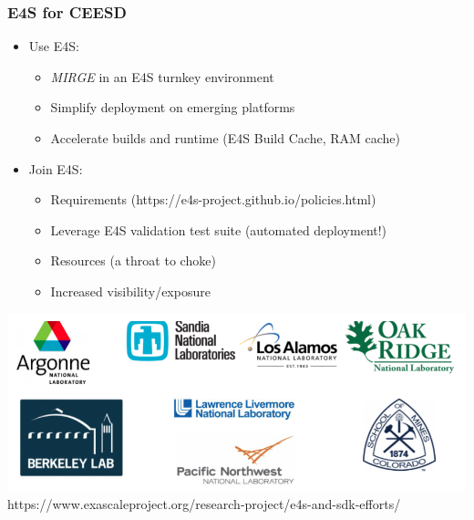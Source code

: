 \begin{frame}\frametitle{E4S for CEESD}
\begin{multicols}{2}
\begin{itemize}
\item Use E4S:
\begin{itemize}
\item \textit{MIRGE} in an E4S turnkey environment
\item Simplify deployment on emerging platforms
\item Accelerate builds and runtime (E4S Build Cache, RAM cache)
\end{itemize}
\columnbreak
\item Join E4S:
\begin{itemize}
\item Requirements (https://e4s-project.github.io/policies.html)
\item Leverage E4S validation test suite (automated deployment!)
\item Resources (a throat to choke)
\item Increased visibility/exposure
\end{itemize}
\end{itemize}
\end{multicols}
\begin{center}
\includegraphics[width=.5\textwidth]{figures/labs.png}\\
https://www.exascaleproject.org/research-project/e4s-and-sdk-efforts/
\end{center}
\end{frame}



